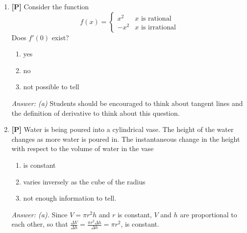 \documentclass[12pt]{article}
\begin{document}
\begin{enumerate}
{\it Answer: (d).} This is a straightforward application of the definition of average rate of change. Once we get $(c)$ as an answer, $(a)$ and $(b)$ follow:
$$\frac{\pi r_2^2-\pi r_1^2}{r_2-r_1}=\pi (r_2+r_1)=2\pi \frac{r_2+r_1}{2}$$

\bigskip

\item {\bf [P]} Consider the function
\[f(x)=\left\{\begin{array}{ll}
             x^2 & \mbox{$x$ is rational} \\
             -x^2 & \mbox{$x$ is irrational}
		\end{array}\right.\]
Does $f'(0)$ exist?
\begin{enumerate}
\item yes
\item no
\item not possible to tell
\end{enumerate}

{\it Answer: (a)} Students should be encouraged to think about 
tangent lines and the definition of derivative to think about this question.

\bigskip

\item {\bf [P]} Water is being poured into a cylindrical vase.  The height of
the water changes as more water is poured in.  The instantaneous
change in the height with respect to the volume of water in the vase
\begin{enumerate}
\item is constant
\item varies inversely as the cube of the radius
\item not enough information to tell.
\end{enumerate}

{\it Answer: (a).} Since $V=\pi r^2 h$ and $r$ is constant, $V$ and $h$ 
are proportional to each other, so that $\displaystyle {\frac{\Delta V}{\Delta h}=\frac{\pi r^2 \Delta h}{\Delta h}=\pi r^2}$, is constant.

\end{enumerate}

\pagebreak
\end{document}
